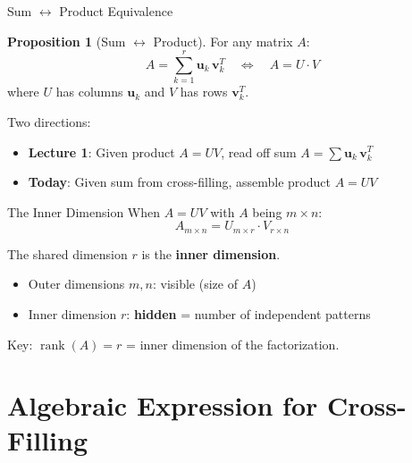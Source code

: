\documentclass[10pt]{beamer}
\theoremstyle{definition}
\newtheorem{prop}{Proposition}[section]
\newcommand{\x}[1]{\alert{\textbf{#1}}}
\begin{document}
\begin{frame}{Sum $\leftrightarrow$ Product Equivalence}
\begin{prop}[Sum $\leftrightarrow$ Product]
For any matrix $A$:
$$A = \sum_{k=1}^r \mathbf{u}_k\,\mathbf{v}_k^T \quad \Longleftrightarrow \quad A = U \cdot V$$
where $U$ has columns $\mathbf{u}_k$ and $V$ has rows $\mathbf{v}_k^T$.
\end{prop}

\vfill
Two directions:
\begin{itemize}
\item \textbf{Lecture 1}: Given product $A = UV$, read off sum $A = \sum \mathbf{u}_k\,\mathbf{v}_k^T$
\item \textbf{Today}: Given sum from cross-filling, assemble product $A = UV$
\end{itemize}
\end{frame}

\begin{frame}{The Inner Dimension}
When $A = UV$ with $A$ being $m \times n$:
$$A_{m \times n} = U_{m \times \boxed{r}} \cdot V_{\boxed{r} \times n}$$

The shared dimension $r$ is the \x{inner dimension}.

\vfill
\begin{itemize}
\item Outer dimensions $m, n$: visible (size of $A$)
\item Inner dimension $r$: \x{hidden} = number of independent patterns
\end{itemize}

\vfill
Key: $\operatorname{rank}(A) = r$ = inner dimension of the factorization.
\end{frame}

\section{Algebraic Expression for Cross-Filling}
\end{document}
